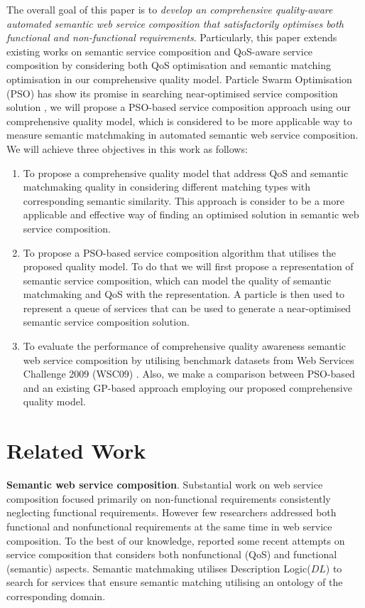 \documentclass{IEEEtran}
\begin{document}
The overall goal of this paper is to \textit{develop an comprehensive quality-aware automated semantic web service composition that satisfactorily optimises both functional and non-functional requirements}. Particularly, this paper extends existing works on semantic service composition and QoS-aware service composition by considering both QoS optimisation and semantic matching optimisation in our comprehensive quality model. Particle Swarm Optimisation (PSO) has show its promise in searching near-optimised service composition solution \cite{da2016particle}, we will propose a PSO-based service composition approach using our comprehensive quality model, which is considered to be more applicable way to measure semantic matchmaking in automated semantic web service composition. We will achieve three objectives in this work as follows:

\begin{enumerate}
 \item To propose a comprehensive quality model that address QoS and semantic matchmaking quality in considering different matching types with corresponding semantic similarity. This approach is consider to be a more applicable and effective way of finding an optimised solution in semantic web service composition.
  
 \item To propose a PSO-based service composition algorithm that utilises the proposed quality model. To do that we will first propose a representation of semantic service composition, which can model the quality of semantic matchmaking and QoS with the representation. A particle is then used to represent a queue of services that can be used to generate a near-optimised semantic service composition solution.
  
 \item To evaluate the performance of comprehensive quality awareness semantic web service composition by utilising benchmark datasets from Web Services Challenge 2009 (WSC09) \cite{kona2009wsc}. Also, we make a comparison between PSO-based and an existing GP-based approach employing our proposed comprehensive quality model.
 
\end{enumerate}

\section{Related Work} \label{relatedWork}
\textbf{Semantic web service composition}. Substantial work \cite{bansal2016generalized,mier2015integrated,da2016particle,da2015graphevol,yu2013adaptive} on web service composition focused primarily on non-functional requirements consistently neglecting functional requirements. However few researchers addressed both functional and nonfunctional requirements at the same time in web service composition. To the best of our knowledge, \cite{lecue2009optimizing,fanjiang2014semantic,pop2009immune} reported some recent attempts on service composition that considers both nonfunctional (QoS) and functional (semantic) aspects. Semantic matchmaking utilises Description Logic($DL$) \cite{baader2003description} to search for services that ensure semantic matching utilising an ontology of the corresponding domain.
\end{document}
